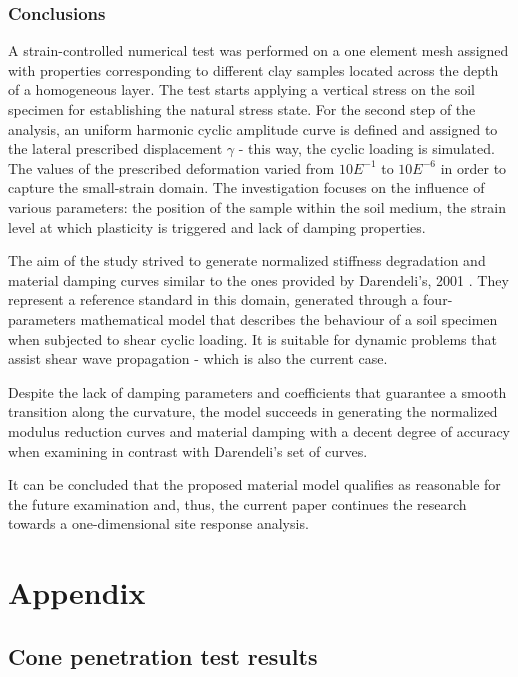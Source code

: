 \documentclass[11pt,a4paper]{report}
\newcommand\blankpage{%
	\null
	\thispagestyle{empty}%
	\addtocounter{page}{-1}%
	\newpage}
\begin{document}
\newpage
\section{Conclusions}
A strain-controlled numerical test was performed on a one element mesh assigned with properties corresponding to different clay samples located across the depth of a homogeneous layer. The test starts applying a vertical stress on the soil specimen for establishing the natural stress state. For the second step of the analysis, an uniform harmonic cyclic amplitude curve is defined and assigned to the lateral prescribed displacement $\gamma$ - this way, the cyclic loading is simulated. The values of the prescribed deformation varied from $10E^{-1}$ to $10E^{-6}$ in order to capture the small-strain domain. The investigation focuses on the influence of various parameters: the position of the sample within the soil medium, the strain level at which plasticity is triggered and lack of damping properties.

 The aim of the study strived to generate normalized stiffness degradation and material damping curves similar to the ones provided by Darendeli's, 2001 \cite{darendeli2001development}. They represent a reference standard in this domain, generated through a four-parameters mathematical model that describes the behaviour of a soil specimen when subjected to shear cyclic loading. It is suitable for dynamic problems that assist shear wave propagation - which is also the current case.

Despite the lack of damping parameters and coefficients that guarantee a smooth transition along the curvature, the model succeeds in generating the normalized modulus reduction curves and material damping with a decent degree of accuracy when examining in contrast with Darendeli's set of curves.  

It can be concluded that the proposed material model qualifies as reasonable for the future examination and, thus, the current paper continues the research towards a one-dimensional site response analysis. 

\afterpage{\blankpage}



\newpage

\appendix
{}
\part{Appendix}
\chapter{Cone penetration test results} \label{App:AppendixA}
\end{document}
